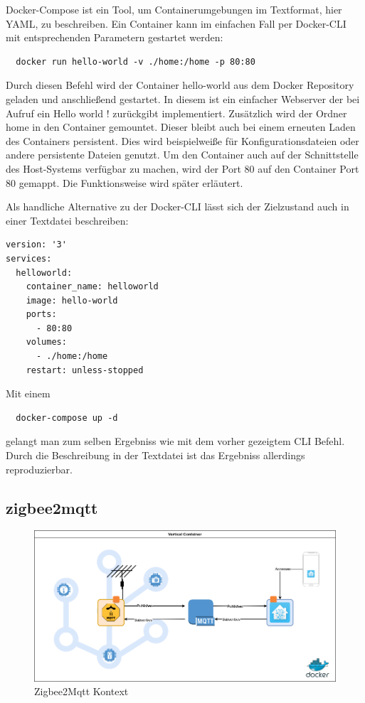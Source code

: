 Docker-Compose ist ein Tool, um Containerumgebungen im Textformat, hier YAML, zu beschreiben.
Ein Container kann im einfachen Fall per Docker-CLI mit entsprechenden Parametern gestartet werden:
\begin{lstlisting}
  docker run hello-world -v ./home:/home -p 80:80
\end{lstlisting}

Durch diesen Befehl wird der Container \grqq hello-world\grqq{} aus dem Docker Repository geladen und anschließend gestartet. In diesem ist ein einfacher Webserver der bei
Aufruf ein \grqq Hello world !\grqq{} zurückgibt implementiert. Zusätzlich wird der Ordner \grqq home\grqq{} in den Container gemountet. Dieser bleibt auch bei einem
erneuten Laden des Containers persistent. Dies wird beispielweiße für Konfigurationsdateien oder andere persistente Dateien genutzt. Um den Container auch auf der Schnittstelle
des Host-Systems verfügbar zu machen, wird der Port 80 auf den Container Port 80 gemappt. Die Funktionsweise wird später erläutert.

Als handliche Alternative zu der Docker-CLI lässt sich der Zielzustand auch in einer Textdatei beschreiben:

\begin{lstlisting}
version: '3'
services:
  helloworld:
    container_name: helloworld
    image: hello-world
    ports:
      - 80:80
    volumes:
      - ./home:/home
    restart: unless-stopped
\end{lstlisting}

Mit einem 
\begin{lstlisting}
  docker-compose up -d
\end{lstlisting}

gelangt man zum selben Ergebniss wie mit dem vorher gezeigtem CLI Befehl. Durch die Beschreibung in der Textdatei ist das Ergebniss allerdings reproduzierbar.

\subsection{zigbee2mqtt}

\begin{figure}[H]
  \centering
  \includegraphics[width=1\textwidth]{media/z2m-arch.png}
  \caption{Zigbee2Mqtt Kontext}
\end{figure}

